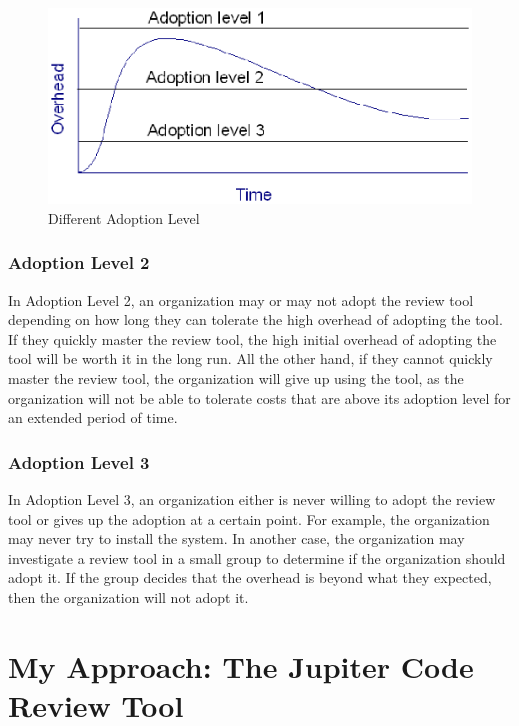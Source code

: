 \begin{figure}[htbp]
  \centering
  \includegraphics{images/fig1-4.eps}
  \caption{Different Adoption Level}
  \label{fig1-4}
\end{figure}

\subsubsection{Adoption Level 2}
\label{subsec:adoption-level-2}

In Adoption Level 2, an organization may or may not adopt the review tool depending on how long they can tolerate the high overhead of adopting the tool. If they quickly master the review tool, the high initial overhead of adopting the tool will be worth it in the long run. All the other hand, if they cannot quickly master the review tool, the organization will give up using the tool, as the organization will not be able to tolerate costs that are above its adoption level for an extended period of time.

\subsubsection{Adoption Level 3}
\label{subsec:adoption-level-3}

In Adoption Level 3, an organization either is never willing to adopt the review tool or gives up the adoption at a certain point. For example, the organization may never try to install the system. In another case, the organization may investigate a review tool in a small group to determine if the organization should adopt it. If the group decides that the overhead is beyond what they expected, then the organization will not adopt it.

\section{My Approach: The Jupiter Code Review Tool}
\label{sec:my-appoach:-the-jupiter-code-review-tool}

